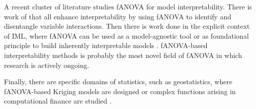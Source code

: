 A recent cluster of literature studies fANOVA for model interpretability. There is work of \cite{lengerich2020, konig2024, choi2025} that all enhance interpretability by using fANOVA to identify and disentangle variable interactions.
Then there is work done in the explicit context of IML, where fANOVA can be used as a model-agnostic tool \citep{hooker2004,fumagalli2025} or as foundational principle to build inherently interpretable models \citep{hu2025}. fANOVA-based interpretability methods is probably the most novel field of fANOVA in which research is actively ongoing.

Finally, there are specific domains of statistics, such as geostatistics, where fANOVA-based Kriging models are designed \citep{muehlenstaedt2012} or
complex functions arising in computational finance are studied \citep{liu2006}.







